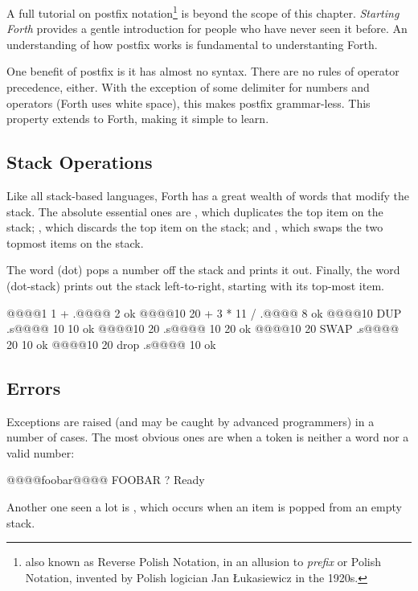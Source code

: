 A full tutorial on postfix notation\footnote{also known as Reverse Polish
  Notation, in an allusion to {\em prefix\/} or Polish Notation, invented by
  Polish logician Jan Łukasiewicz in the 1920s.} is beyond the scope of this
chapter. {\em Starting Forth\/} provides a gentle introduction for people who
have never seen it before. An understanding of how postfix works is fundamental
to understanting Forth.

One benefit of postfix is it has almost no syntax. There are no rules of
operator precedence, either. With the exception of some delimiter for numbers
and operators (Forth uses white space), this makes postfix grammar-less. This
property extends to Forth, making it simple to learn.

\subsection{Stack Operations}

Like all stack-based languages, Forth has a great wealth of words that modify
the stack. The absolute essential ones are , which duplicates the top
item on the stack; , which discards the top item on the stack; and
, which swaps the two topmost items on the stack.

The word  (dot) pops a number off the stack and prints it out. Finally,
the word  (dot-stack) prints out the stack left-to-right, starting with
its top-most item.

\begin{intrcode}
@@@@1 1 + .@@@@  2 ok
@@@@10 20 + 3 * 11 / .@@@@  8 ok
@@@@10 DUP .s@@@@  10 10 ok
@@@@10 20 .s@@@@  10 20 ok
@@@@10 20 SWAP .s@@@@  20 10 ok
@@@@10 20 drop .s@@@@  10 ok
\end{intrcode}


\subsection{Errors}

Exceptions are raised (and may be caught by advanced programmers) in a number
of cases. The most obvious ones are when a token is neither a word nor a valid
number:

\begin{intrcode}
@@@@foobar@@@@ FOOBAR  ? Ready
\end{intrcode}

\noindent Another one seen a lot is , which occurs when an item
is popped from an empty stack.

